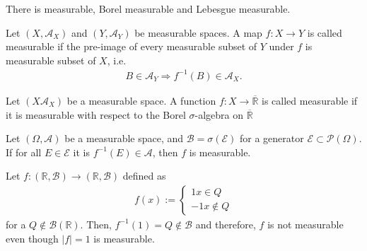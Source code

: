 There is measurable, Borel measurable and Lebesgue measurable.
\begin{definition}
    Let \((X, \mathcal{A}_X)\) and \((Y, \mathcal{A}_Y)\) be measurable spaces. A map \(f: X \rightarrow Y\) is called measurable if the pre-image of every measurable subset of \(Y\) under \(f\) is measurable subset of \(X\), i.e.
        \begin{align}
            B \in \mathcal{A}_Y \Rightarrow f^{-1}(B) \in \mathcal{A}_X \text{.}
        \end{align}
\end{definition}
%
%
%
%
%
\begin{definition}
    Let \((X \mathcal{A}_X)\) be a measurable space. A function \(f: X \rightarrow \overline{\mathbb{R}}\) is called measurable if it is measurable with respect to the Borel \(\sigma\)-algebra on \(\overline{\mathbb{R}}\)
\end{definition}
%
%
%
%
%
%
\begin{definition}
    
\end{definition}
%
%
%
%
%
\begin{theorem}
    Let \((\Omega, \mathcal{A})\) be a measurable space, and \(\mathcal{B} = \sigma(\mathcal{E})\) for a generator \(\mathcal{E} \subset \mathcal{P}(\Omega)\). If for all \(E \in \mathcal{E}\) it is \(f^{-1}(E) \in \mathcal{A}\), then \(f\) is measurable.
\end{theorem}
\begin{example}
    Let \(f:(\mathbb{R}, \mathcal{B}) \rightarrow (\mathbb{R}, \mathcal{B})\) defined as
    \begin{align}
        f(x) := \begin{cases}
            1 x \in Q \\
            -1 x \notin Q
        \end{cases}
    \end{align}
    for a \(Q \notin \mathcal{B}(\mathbb{R})\). Then, \(f^{-1}({1})=Q \notin \mathcal{B}\) and therefore, \(f\) is not measurable even though \(|f| = 1\) is measurable.
\end{example}